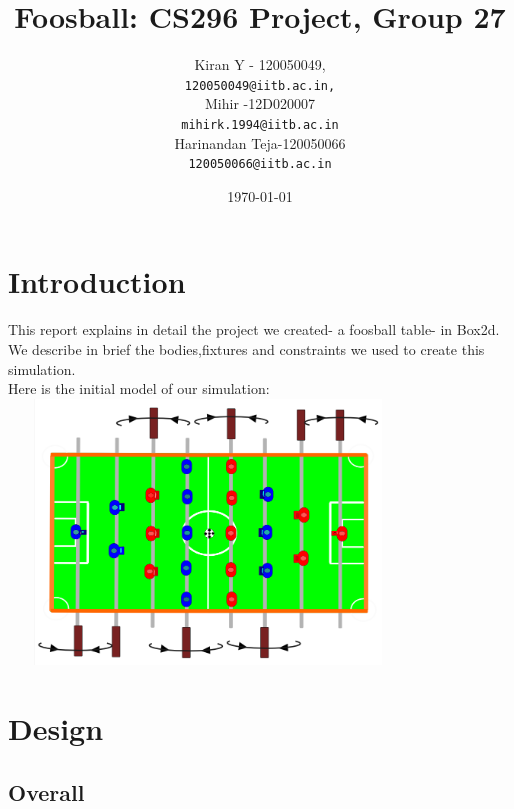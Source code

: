 \documentclass{article}
\begin{document}
\nocite{*}

\title{Foosball: CS296 Project, Group 27}

\author{
Kiran Y - 120050049,\\
\texttt{120050049@iitb.ac.in,}\\
Mihir -12D020007\\
\texttt{mihirk.1994@iitb.ac.in}\\
Harinandan Teja-120050066\\
\texttt{120050066@iitb.ac.in}\\
}
\date{\today}

\maketitle

\section{Introduction}
This report explains in detail the project we created- a foosball table- in Box2d. We describe in brief the bodies,fixtures and constraints we used to create this simulation.\\
Here is the initial model of our simulation:\\
\includegraphics[width=300pt,height=200pt]{foosball}

\section{Design}

\subsection{Overall}
\end{document}
